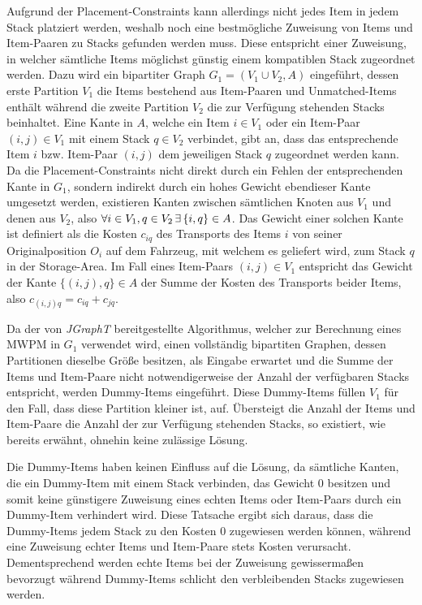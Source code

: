 Aufgrund der Placement-Constraints kann allerdings nicht jedes Item in jedem Stack platziert werden, weshalb noch eine bestmögliche Zuweisung von Items und Item-Paaren zu Stacks gefunden werden muss. Diese entspricht einer Zuweisung, in welcher sämtliche Items möglichst günstig einem kompatiblen Stack zugeordnet werden. Dazu wird ein bipartiter Graph $G_1 = (V_1 \cup V_2, A)$ eingeführt, dessen erste Partition $V_1$ die Items bestehend aus Item-Paaren und Unmatched-Items enthält während die zweite Partition $V_2$ die zur Verfügung stehenden Stacks beinhaltet.
Eine Kante in $A$, welche ein Item $i \in V_1$ oder ein Item-Paar $(i, j) \in V_1$ mit einem Stack $q \in V_2$ verbindet, gibt an, dass das entsprechende Item $i$ bzw. Item-Paar $(i, j)$ dem jeweiligen Stack $q$ zugeordnet werden kann. Da die Placement-Constraints nicht direkt durch ein Fehlen der entsprechenden Kante in $G_1$, sondern indirekt durch ein hohes Gewicht ebendieser Kante umgesetzt werden, existieren Kanten zwischen sämtlichen Knoten
aus $V_1$ und denen aus $V_2$, also $\forall i \in V_1, q \in V_2 \thinspace \exists \thinspace \{i, q\} \in A$.
Das Gewicht einer solchen Kante ist definiert als die Kosten $c_{iq}$ des Transports des Items $i$ von seiner Originalposition $O_i$ auf dem Fahrzeug, mit welchem es geliefert wird, zum Stack $q$
in der Storage-Area. Im Fall eines Item-Paars $(i, j) \in V_1$ entspricht das
Gewicht der Kante $\{(i, j), q\} \in A$ der Summe der Kosten des Transports beider Items, also $c_{(i, j)q} = c_{iq} + c_{jq}$.

Da der von \textit{JGraphT} bereitgestellte Algorithmus, welcher zur Berechnung eines \textsc{MWPM} in $G_1$ verwendet wird,
einen vollständig bipartiten Graphen, dessen Partitionen dieselbe Größe besitzen, als Eingabe erwartet und die Summe der Items und Item-Paare
nicht notwendigerweise der Anzahl der verfügbaren Stacks entspricht, werden Dummy-Items eingeführt.
Diese Dummy-Items füllen $V_1$ für den Fall, dass diese Partition kleiner ist, auf.
Übersteigt die Anzahl der Items und Item-Paare die Anzahl der zur Verfügung stehenden Stacks, so existiert,
wie bereits erwähnt, ohnehin keine zulässige Lösung.

Die Dummy-Items haben keinen Einfluss auf die Lösung, da sämtliche Kanten, die ein Dummy-Item mit einem Stack verbinden,
das Gewicht $0$ besitzen und somit keine günstigere Zuweisung eines echten Items oder Item-Paars durch ein Dummy-Item
verhindert wird. Diese Tatsache ergibt sich daraus, dass die Dummy-Items jedem Stack zu den Kosten $0$ zugewiesen
werden können, während eine Zuweisung echter Items und Item-Paare stets Kosten verursacht. Dementsprechend werden
echte Items bei der Zuweisung gewissermaßen bevorzugt während Dummy-Items schlicht den verbleibenden Stacks zugewiesen werden.

